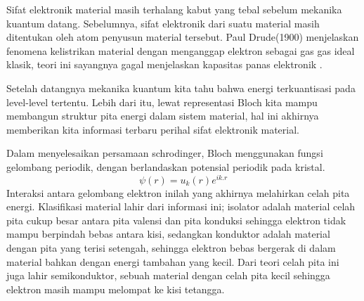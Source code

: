 Sifat elektronik material masih terhalang kabut yang tebal sebelum mekanika kuantum datang. Sebelumnya, sifat elektronik dari suatu material masih ditentukan oleh atom penyusun material tersebut. Paul Drude(1900) menjelaskan fenomena kelistrikan material dengan menganggap elektron sebagai gas gas ideal klasik, teori ini sayangnya gagal menjelaskan kapasitas panas elektronik \parencite{kittel1955solid}.

\par

Setelah datangnya mekanika kuantum kita tahu bahwa energi terkuantisasi pada level-level tertentu. Lebih dari itu, lewat representasi Bloch kita mampu membangun struktur pita energi dalam sistem material, hal ini akhirnya memberikan kita informasi terbaru perihal sifat elektronik material.

\par

Dalam menyelesaikan persamaan schrodinger, Bloch menggunakan fungsi gelombang periodik, dengan berlandaskan potensial periodik pada kristal.
\[
  \psi(r) = u_k(r) e^{ik.r}
\]
Interaksi antara gelombang elektron inilah yang akhirnya melahirkan celah pita energi. Klasifikasi material lahir dari informasi ini; isolator adalah material celah pita cukup besar antara pita valensi dan pita konduksi sehingga elektron tidak mampu berpindah bebas antara kisi, sedangkan konduktor adalah material dengan pita yang terisi setengah, sehingga elektron bebas bergerak di dalam material bahkan dengan energi tambahan yang kecil. Dari teori celah pita ini juga lahir semikonduktor, sebuah material dengan celah pita kecil sehingga elektron masih mampu melompat ke kisi tetangga.

